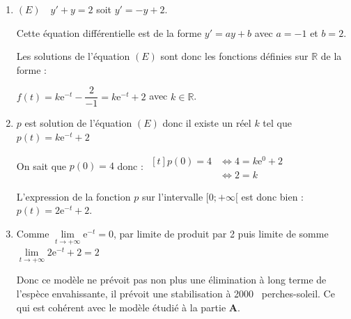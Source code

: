 \documentclass[10pt]{article}
\providecommand{\R}{\mathbb{R}}
\providecommand{\e}{{\mathrm{e}}}
\providecommand{\np}[2][]{{#2~#1}}
\begin{document}
	\begin{enumerate}
		\item $(E) \quad y'+y=2$ \quad soit \quad $y'=-y+2$.

		Cette équation différentielle est de la forme \quad $y'=ay+b$ \quad avec $a=-1$ et $b=2$.

		Les solutions de l'équation $(E)$ sont donc les fonctions définies sur $\R$ de la forme :

		$f(t) = k \e^{-t} - \dfrac{2}{-1}= k\e^{-t} +2$ \quad avec $k \in \R$.


		\item $p$ est solution de l'équation $(E)$ donc il existe un réel $k$ tel que $p(t) = k\e^{-t} +2$

		On sait que $p(0)=4$ donc : \quad $\begin{aligned}[t]
			p(0) = 4 &\iff 4= k \e^{0} +2 \\
		&\iff 2 = k
		\end{aligned}$

	L'expression de la fonction $p$ sur l'intervalle $[0;+\infty[$ est donc bien : \quad $p(t)=2 \e^{-t}+2$.
		\item Comme $\lim\limits_{t\to +\infty} \e^{-t} = 0$, par limite de produit par 2 puis limite de somme $\lim\limits_{t\to +\infty} 2 \e^{-t} + 2 = 2$

Donc ce modèle ne prévoit pas non plus une élimination à long terme de l'espèce envahissante, il prévoit une stabilisation à \np{2000} perches-soleil. Ce qui est cohérent avec le modèle étudié à la partie \textbf{A}.
	\end{enumerate}
\end{document}
